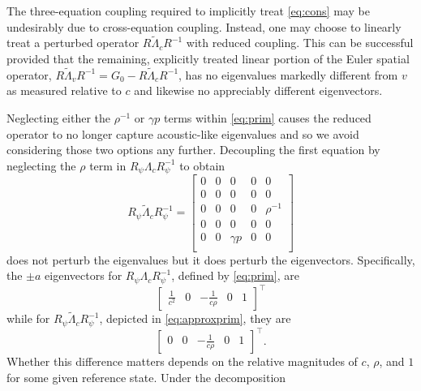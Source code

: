 \documentclass[letterpaper,11pt,nointlimits,reqno]{amsart}
\begin{document}
The three-equation coupling required to implicitly treat \eqref{eq:cons} may be
undesirably due to cross-equation coupling.  Instead, one may choose to
linearly treat a perturbed operator $ R \tilde\Lambda_c R^{-1} $ with reduced
coupling.  This can be successful provided that the remaining, explicitly
treated linear portion of the Euler spatial operator, $ R \tilde\Lambda_v
R^{-1} = G_0 - R \tilde\Lambda_c R^{-1} $, has no eigenvalues markedly
different from $v$ as measured relative to $c$ and likewise no appreciably
different eigenvectors.

Neglecting either the $\rho^{-1}$ or $\gamma p$ terms within \eqref{eq:prim}
causes the reduced operator to no longer capture acoustic-like eigenvalues and
so we avoid considering those two options any further.  Decoupling the first
equation by neglecting the $\rho$ term in $R_\psi \Lambda_c R_\psi^{-1}$ to
obtain
\begin{equation}\label{eq:approxprim}
 R_\psi \tilde\Lambda_c R_\psi^{-1} =
 \begin{bmatrix}
   0  &  0  &  0          & 0 &  0          \\
   0  &  0  &  0          & 0 &  0          \\
   0  &  0  &  0          & 0 &  \rho^{-1}  \\
   0  &  0  &  0          & 0 &  0          \\
   0  &  0  &  \gamma{}p  & 0 &  0          \\
 \end{bmatrix}
\end{equation}
does not perturb the eigenvalues but it does perturb the eigenvectors.
Specifically, the $\pm{}a$ eigenvectors for $R_\psi \Lambda_c R_\psi^{-1}$,
defined by \eqref{eq:prim}, are
\begin{equation}\label{eq:primev}
\begin{bmatrix} \frac{1}{c^2} & 0 & -\frac{1}{c\rho} & 0 & 1 \end{bmatrix}^\top
\end{equation}
while for $R_\psi \tilde\Lambda_c R_\psi^{-1}$, depicted in
\eqref{eq:approxprim}, they are
\begin{equation}\label{eq:approxprimev}
\begin{bmatrix} 0 & 0 & -\frac{1}{c\rho} & 0 & 1 \end{bmatrix}^\top
.
\end{equation}
Whether this difference matters depends on the relative magnitudes of $c$,
$\rho$, and $1$ for some given reference state.  Under the decomposition
\end{document}
